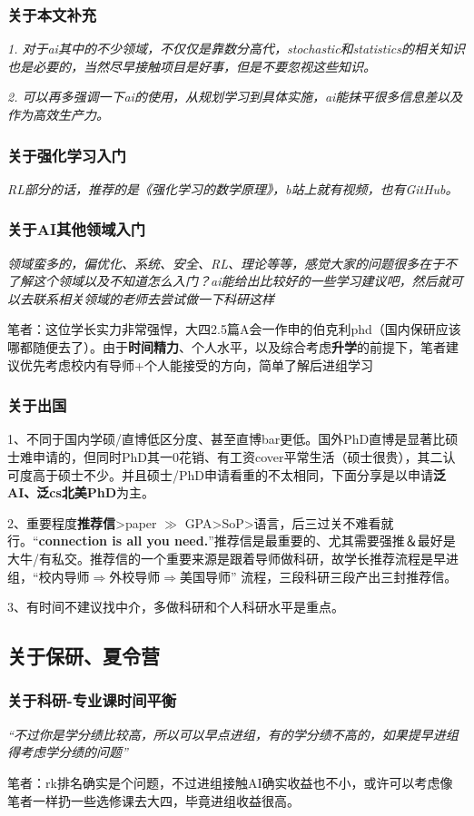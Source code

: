 \documentclass[12pt, a4paper, fontset=ubuntu]{ctexart}
\begin{document}
{\subsubsection{关于本文补充}
\textit{1. 对于ai其中的不少领域，不仅仅是靠数分高代，stochastic和statistics的相关知识也是必要的，当然尽早接触项目是好事，但是不要忽视这些知识。}
\par \textit{2. 可以再多强调一下ai的使用，从规划学习到具体实施，ai能抹平很多信息差以及作为高效生产力。}
\subsubsection{关于强化学习入门}
\textit{RL部分的话，推荐的是《强化学习的数学原理》，b站上就有视频，也有GitHub。}
\subsubsection{关于AI其他领域入门}
\textit{领域蛮多的，偏优化、系统、安全、RL、理论等等，感觉大家的问题很多在于不了解这个领域以及不知道怎么入门？ai能给出比较好的一些学习建议吧，然后就可以去联系相关领域的老师去尝试做一下科研这样}
\par 笔者：这位学长实力非常强悍，大四2.5篇A会一作申的伯克利phd（国内保研应该哪都随便去了）。由于\textbf{时间精力}、个人水平，以及综合考虑\textbf{升学}的前提下，笔者建议优先考虑校内有导师+个人能接受的方向，简单了解后进组学习
\subsubsection{关于出国}
1、不同于国内学硕/直博低区分度、甚至直博bar更低。国外PhD直博是显著比硕士难申请的，但同时PhD其一0花销、有工资cover平常生活（硕士很贵），其二认可度高于硕士不少。并且硕士/PhD申请看重的不太相同，下面分享是以申请\textbf{泛AI、泛cs北美PhD}为主。
\par 2、重要程度\textbf{推荐信}>paper $\gg$ GPA>SoP>语言，后三过关不难看就行。“\textbf{connection is all you need.}”推荐信是最重要的、尤其需要强推＆最好是大牛/有私交。推荐信的一个重要来源是跟着导师做科研，故学长推荐流程是早进组，“校内导师$\Rightarrow$外校导师$\Rightarrow$美国导师” 流程，三段科研三段产出三封推荐信。
\par 3、有时间不建议找中介，多做科研和个人科研水平是重点。
\subsection{关于保研、夏令营}
\subsubsection{关于科研-专业课时间平衡}
\textit{“不过你是学分绩比较高，所以可以早点进组，有的学分绩不高的，如果提早进组得考虑学分绩的问题”}
\par 笔者：rk排名确实是个问题，不过进组接触AI确实收益也不小，或许可以考虑像笔者一样扔一些选修课去大四，毕竟进组收益很高。
}
\end{document}
